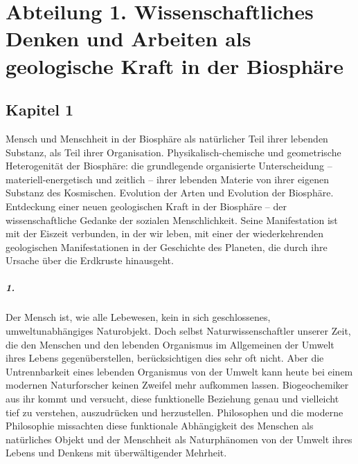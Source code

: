 \documentclass[11pt,a4paper]{book}
\begin{document}
\tableofcontents

\chapter[Biosphäre und Denken]{Abteilung 1. Wissenschaftliches Denken und
  Arbeiten als geologische Kraft in der Biosphäre}

\section{Kapitel 1} 

Mensch und Menschheit in der Biosphäre als natürlicher Teil ihrer lebenden
Substanz, als Teil ihrer Organisation. Physikalisch-chemische und geometrische
Heterogenität der Biosphäre: die grundlegende organisierte Unterscheidung --
materiell-energetisch und zeitlich -- ihrer lebenden Materie von ihrer eigenen
Substanz des Kosmischen. Evolution der Arten und Evolution der Biosphäre.
Entdeckung einer neuen geologischen Kraft in der Biosphäre -- der
wissenschaftliche Gedanke der sozialen Menschlichkeit. Seine Manifestation ist
mit der Eiszeit verbunden, in der wir leben, mit einer der wiederkehrenden
geologischen Manifestationen in der Geschichte des Planeten, die durch ihre
Ursache über die Erdkruste hinausgeht.

\paragraph{1.}
Der Mensch ist, wie alle Lebewesen, kein in sich geschlossenes,
umweltunabhängiges Naturobjekt. Doch selbst Naturwissenschaftler unserer Zeit,
die den Menschen und den lebenden Organismus im Allgemeinen der Umwelt ihres
Lebens gegenüberstellen, berücksichtigen dies sehr oft nicht. Aber die
Untrennbarkeit eines lebenden Organismus von der Umwelt kann heute bei einem
modernen Naturforscher keinen Zweifel mehr aufkommen lassen. Biogeochemiker
aus ihr kommt und versucht, diese funktionelle Beziehung genau und vielleicht
tief zu verstehen, auszudrücken und herzustellen. Philosophen und die moderne
Philosophie missachten diese funktionale Abhängigkeit des Menschen als
natürliches Objekt und der Menschheit als Naturphänomen von der Umwelt ihres
Lebens und Denkens mit überwältigender Mehrheit.
\end{document}
